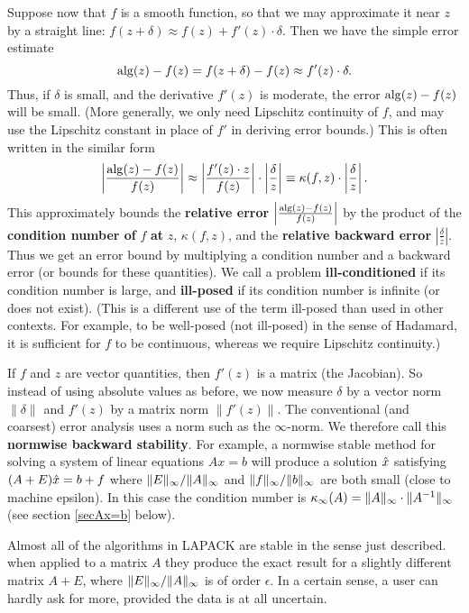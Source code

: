 Suppose now that $f$ is a smooth function, so that
we may approximate it near $z$ by a straight line:
$f(z+\delta) \approx f(z) + f'(z) \cdot \delta$.
Then we have the simple error estimate
\[
{\rm alg} (z)-f(z) = f(z+\delta) - f(z) \approx f'(z) \cdot \delta .
\]
Thus, if $\delta$ is small, and the derivative $f'(z)$ is
moderate, the error ${\rm alg} (z)-f(z)$ will be small. (More generally,
we only need Lipschitz continuity of $f$, and may use the Lipschitz
constant in place of $f'$ in deriving error bounds.)
This is often written
in the similar form
\[
\left| \frac{{\rm alg} (z)-f(z)}{f(z)} \right|
\approx
\left| \frac{f'(z) \cdot z}{f(z)} \right| \cdot
\left| \frac{\delta}{z} \right| \equiv \kappa (f,z)
\cdot \left| \frac{\delta}{z} \right|
.\]
This approximately bounds the {\bf relative error}
$\left| \frac{{\rm alg} (z)-f(z)}{f(z)} \right|$ by the product of
the {\bf condition number of}
$f$ {\bf at} $z$, $\kappa (f,z)$, and the
{\bf relative backward error} $|\frac{\delta}{z}|$.
Thus we get an error bound by multiplying a
condition number and
a backward error (or bounds for these quantities). We call a problem
{\bf ill-conditioned} if its condition number is large,
and {\bf ill-posed}
if its condition number is infinite (or does not exist). (This is
a different use of the term ill-posed than used in other contexts. For
example, to be well-posed (not ill-posed) in the sense of Hadamard,
it is sufficient for $f$ to be continuous,
whereas we require Lipschitz continuity.)

If $f$ and $z$ are vector quantities, then $f'(z)$ is a matrix
(the Jacobian). So instead of using absolute values as before,
we now measure $\delta$ by a vector norm $\| \delta \|$ and $f'(z)$
by a matrix norm $\|f'(z)\|$. The conventional (and coarsest) error analysis
uses a norm such as the $\infty$-norm. We therefore call
this {\bf normwise backward stability}.
For example, a normwise stable
method for solving a system of linear equations $Ax=b$ will
produce a solution $\hat{x}$ satisfying $(A+E)\hat{x}=b+f$ where
$\|E\|_{\infty} / \|A\|_{\infty}$ and
$\|f\|_{\infty} / \|b\|_{\infty}$ are both small (close to machine epsilon).
In this case the condition number is
\mbox{$\kappa_{\infty} (A) = \|A\|_{\infty} \cdot \|A^{-1}\|_{\infty}$}
(see section \ref{secAx=b} below).

Almost all of the algorithms in LAPACK
are stable in the sense just described.
when applied to a matrix $A$
they produce the exact result for a slightly different matrix $A+E$,
where $\|E\|_{\infty} / \|A\|_{\infty}$ is of order $\epsilon$.
In a certain sense, a user can hardly ask for more, provided the
data is at all uncertain.

